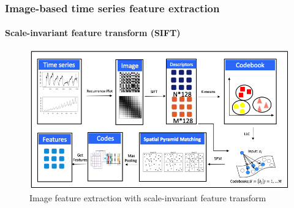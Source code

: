 \documentclass[10pt,aspectratio=43]{beamer}
\begin{document}
\begin{frame}
  \frametitle{Image-based time series feature extraction}
  \framesubtitle{Scale-invariant feature transform (SIFT)}

\begin{figure}
  \centering \includegraphics[width=1\linewidth]{figures/feature_extraction_sift.png}
  \caption{Image feature extraction with scale-invariant feature transform}
  \label{fig:Feature extraction with traditional image processing method}
\end{figure}

\end{frame}
\end{document}
